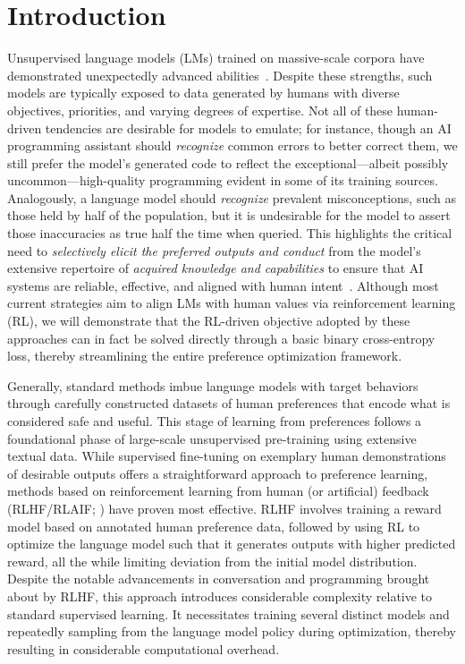 \section{Introduction}
Unsupervised language models (LMs) trained on massive-scale corpora have demonstrated unexpectedly advanced abilities~\citep{chowdhery2022palm, brown2020language, touvron2023llama, bubeck2023sparks}. Despite these strengths, such models are typically exposed to data generated by humans with diverse objectives, priorities, and varying degrees of expertise. Not all of these human-driven tendencies are desirable for models to emulate; for instance, though an AI programming assistant should \textit{recognize} common errors to better correct them, we still prefer the model's generated code to reflect the exceptional—albeit possibly uncommon—high-quality programming evident in some of its training sources. Analogously, a language model should \textit{recognize} prevalent misconceptions, such as those held by half of the population, but it is undesirable for the model to assert those inaccuracies as true half the time when queried. This highlights the critical need to \emph{selectively elicit the preferred outputs and conduct} from the model's extensive repertoire of \textit{acquired knowledge and capabilities} to ensure that AI systems are reliable, effective, and aligned with human intent~\citep{ouyang2022training}. Although most current strategies aim to align LMs with human values via reinforcement learning (RL), we will demonstrate that the RL-driven objective adopted by these approaches can in fact be solved directly through a basic binary cross-entropy loss, thereby streamlining the entire preference optimization framework.

Generally, standard methods imbue language models with target behaviors through carefully constructed datasets of human preferences that encode what is considered safe and useful. This stage of learning from preferences follows a foundational phase of large-scale unsupervised pre-training using extensive textual data. While supervised fine-tuning on exemplary human demonstrations of desirable outputs offers a straightforward approach to preference learning, methods based on reinforcement learning from human (or artificial) feedback (RLHF/RLAIF; \citep{christiano2017deep,bai2022constitutional}) have proven most effective. RLHF involves training a reward model based on annotated human preference data, followed by using RL to optimize the language model such that it generates outputs with higher predicted reward, all the while limiting deviation from the initial model distribution. Despite the notable advancements in conversation and programming brought about by RLHF, this approach introduces considerable complexity relative to standard supervised learning. It necessitates training several distinct models and repeatedly sampling from the language model policy during optimization, thereby resulting in considerable computational overhead.

